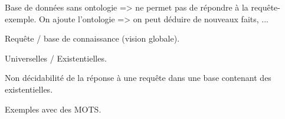 
Base de données sans ontologie => ne permet pas de répondre à la requête-exemple.
On ajoute l'ontologie => on peut déduire de nouveaux faits, ...

Requête / base de connaissance (vision globale).

Universelles / Existentielles.

Non décidabilité de la réponse à une requête dans une base contenant des existentielles.

Exemples avec des MOTS.



